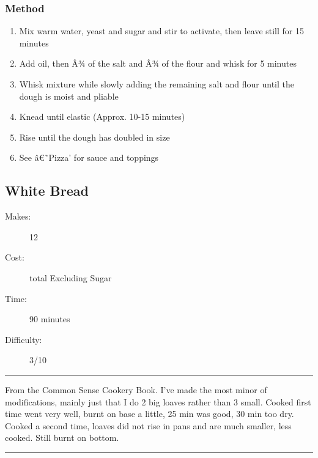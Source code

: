 \documentclass[]{article}
\begin{document}
\subsubsection*{\Large Method}
\begin{enumerate}[font=\huge\color{accent}]
	\item Mix warm water, yeast and sugar and stir to activate, then leave still for 15 minutes
	\item Add oil, then Â¾ of the salt and Â¾ of the flour and whisk for 5 minutes
	\item Whisk mixture while slowly adding the remaining salt and flour until the dough is moist and pliable
	\item Knead until elastic (Approx. 10-15 minutes)
	\item Rise until the dough has doubled in size
	\item See â€˜Pizza' for sauce and toppings
\end{enumerate}
\newpage
{}\label{rec:White Bread}
\subsection*{\center\huge White Bread}
\begin{description}
\item[Makes:] 12 
\item[Cost:]  total Excluding Sugar
\item[Time:] 90 minutes
\item[Difficulty:] 3/10
\end{description}
\vspace{0.2cm}\hrule\vspace{0.5cm}
\begin{adjustwidth}{0.5 cm}{0.5 cm}

From the Common Sense Cookery Book. I've made the most minor of modifications, mainly just that I do 2 big loaves rather than 3 small. Cooked first time went very well, burnt on base a little, 25 min was good, 30 min too dry. Cooked a second time, loaves did not rise in pans and are much smaller, less cooked. Still burnt on bottom. \hfill{}\color{black}

\end{adjustwidth}
\vspace{0.5cm}\hrule
\end{document}
